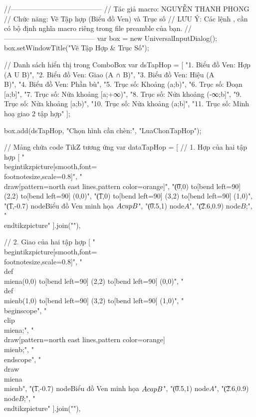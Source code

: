 //---------------------------------------
// Tác giả macro: NGUYỄN THANH PHONG
// Chức năng: Vẽ Tập hợp (Biểu đồ Ven) và Trục số
// LƯU Ý: Các lệnh \IntervalLR, \IntervalGRF cần có bộ định nghĩa macro riêng trong file preamble của bạn.
//---------------------------------------
var box = new UniversalInputDialog();
box.setWindowTitle("Vẽ Tập Hợp & Trục Số");

// Danh sách hiển thị trong ComboBox
var dsTapHop = [
"1. Biểu đồ Ven: Hợp (A U B)",
"2. Biểu đồ Ven: Giao (A ∩ B)",
"3. Biểu đồ Ven: Hiệu (A \\ B)",
"4. Biểu đồ Ven: Phần bù",
"5. Trục số: Khoảng (a;b)",
"6. Trục số: Đoạn [a;b]",
"7. Trục số: Nửa khoảng [a;+∞)",
"8. Trục số: Nửa khoảng (-∞;b]",
"9. Trục số: Nửa khoảng [a;b)",
"10. Trục số: Nửa khoảng (a;b]",
"11. Trục số: Minh hoạ giao 2 tập hợp"
];

box.add(dsTapHop, "Chọn hình cần chèn:", "LuaChonTapHop");

// Mảng chứa code TikZ tương ứng
var dataTapHop = [
// 1. Hợp của hai tập hợp
[
"\\begin{tikzpicture}[smooth,font=\\footnotesize,scale=0.8]",
"\t\\draw[pattern=north east lines,pattern color=orange]",
"\t(0,0) to[bend left=90] (2,2) to[bend left=90] (0,0)",
"\t(1,0) to[bend left=90] (3,2) to[bend left=90] (1,0)",
"\t(1,-0.7) node{Biểu đồ Ven minh họa $A \\cup B$}",
"\t(0.5,1) node{$A$}",
"\t(2.6,0.9) node{$B$};",
"\\end{tikzpicture}"
].join("\n"),

// 2. Giao của hai tập hợp
[
"\\begin{tikzpicture}[smooth,font=\\footnotesize,scale=0.8]",
"\t\\def\\miena{(0,0) to[bend left=90] (2,2) to[bend left=90] (0,0)}",
"\t\\def\\mienb{(1,0) to[bend left=90] (3,2) to[bend left=90] (1,0)}",
"\t\\begin{scope}",
"\t\\clip \\miena;",
"\t\\draw[pattern=north east lines,pattern color=orange] \\mienb;",
"\t\\end{scope}",
"\t\\draw \\miena \\mienb",
"\t(1,-0.7) node{Biểu đồ Ven minh họa $A \\cap B$}",
"\t(0.5,1) node{$A$}",
"\t(2.6,0.9) node{$B$};",
"\\end{tikzpicture}"
].join("\n"),

